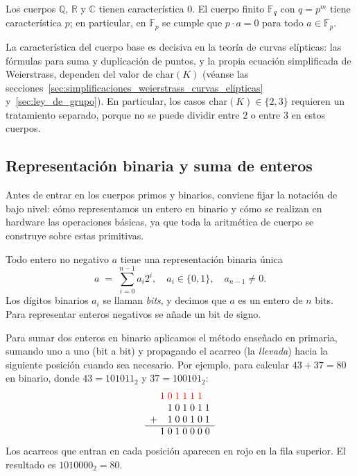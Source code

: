 \begin{ejemplo}
Los cuerpos \(\mathbb{Q}\), \(\mathbb{R}\) y \(\mathbb{C}\) tienen característica \(0\). El cuerpo finito \(\mathbb{F}_q\) con \(q = p^m\) tiene característica \(p\); en particular, en \(\mathbb{F}_p\) se cumple que \(p\cdot a = 0\) para todo \(a\in\mathbb{F}_p\).
\end{ejemplo}

\begin{remark}
La característica del cuerpo base es decisiva en la teoría de curvas elípticas: las fórmulas para suma y duplicación de puntos, y la propia ecuación simplificada de Weierstrass, dependen del valor de \(\mathrm{char}(K)\) (véanse las secciones~\ref{sec:simplificaciones_weierstrass_curvas_elipticas} y~\ref{sec:ley_de_grupo}). En particular, los casos \(\mathrm{char}(K)\in\{2,3\}\) requieren un tratamiento separado, porque no se puede dividir entre \(2\) o entre \(3\) en estos cuerpos.
\end{remark}

\subsection{Representación binaria y suma de enteros}
Antes de entrar en los cuerpos primos y binarios, conviene fijar la notación de bajo nivel: cómo representamos un entero en binario y cómo se realizan en hardware las operaciones básicas, ya que toda la aritmética de cuerpo se construye sobre estas primitivas.

Todo entero no negativo \(a\) tiene una representación binaria única
\[
  a \;=\;\sum_{i=0}^{n-1} a_i 2^i,
  \quad a_i\in\{0,1\},\quad a_{n-1}\neq0.
\]
Los dígitos binarios \(a_i\) se llaman \emph{bits}, y decimos que \(a\) es un entero de \(n\) bits. Para representar enteros negativos se añade un bit de signo.

Para sumar dos enteros en binario aplicamos el método enseñado en primaria, sumando uno a uno (bit a bit) y propagando el acarreo (la \emph{llevada}) hacia la siguiente posición cuando sea necesario. Por ejemplo, para calcular \(43+37=80\) en binario, donde \(43 = 101011_2\) y \(37 = 100101_2\):
\[
\begin{array}{r@{\;}c@{\;}c@{\;}c@{\;}c@{\;}c@{\;}c@{\;}c}
   & {\color{red}1} & {\color{red}0} & {\color{red}1} & {\color{red}1} & {\color{red}1} & {\color{red}1} &   \\
   &                & 1              & 0              & 1              & 0              & 1              & 1 \\
+  &                & 1              & 0              & 0              & 1              & 0              & 1 \\\hline
   & 1              & 0              & 1              & 0              & 0              & 0              & 0 \\
\end{array}
\]
Los acarreos que entran en cada posición aparecen en rojo en la fila superior. El resultado es \(1010000_2 = 80\).

